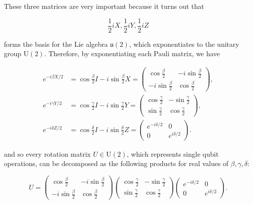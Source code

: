 \documentclass{article}
\begin{document}
  \begin{theorem}
    \label{thm:commutation-relations-of-the-pauli-matrices}
    These three matrices are very important because it turns out that

      \begin{equation}
        \frac{1}{2} i X, \frac{1}{2} i Y, \frac{1}{2} i Z
      \end{equation}

    forms the basis for the Lie algebra $\mathfrak{u}(2)$, which exponentiates to the unitary group $\text{U}(2)$. Therefore, by exponentiating each Pauli matrix, we have

    \begin{align*}
      e^{-i \beta X /2} &= \cos \frac{\beta}{2} I - i \sin \frac{\beta}{2} X = \begin{pmatrix} \cos \frac{\beta}{2} & -i \sin \frac{\beta}{2} \\ -i \sin \frac{\beta}{2} & \cos \frac{\beta}{2} \end{pmatrix}, \\
      e^{-i \gamma Y/2} &= \cos \frac{\gamma}{2} I - i \sin \frac{\gamma}{2} Y = \begin{pmatrix} \cos \frac{\gamma}{2} & - \sin \frac{\gamma}{2} \\ \sin \frac{\gamma}{2} & \cos \frac{\gamma}{2} \end{pmatrix}, \\
      e^{-i \delta Z/2} &= \cos \frac{\delta}{2} I - i \sin \frac{\delta}{2} Z = \begin{pmatrix} e^{-i \delta /2} & 0 \\ 0 & e^{i\delta/2} \end{pmatrix}.
    \end{align*}

    and so every rotation matrix $U \in \text{U}(2)$, which represents single qubit operations, can be decomposed as the following products for real values of $\beta, \gamma, \delta$:

    \begin{equation}
      U = \begin{pmatrix} \cos \frac{\beta}{2} & -i \sin \frac{\beta}{2} \\ -i \sin \frac{\beta}{2} & \cos \frac{\beta}{2} \end{pmatrix} \begin{pmatrix} \cos \frac{\gamma}{2} & - \sin \frac{\gamma}{2} \\ \sin \frac{\gamma}{2} & \cos \frac{\gamma}{2} \end{pmatrix} \begin{pmatrix} e^{-i \delta /2} & 0 \\ 0 & e^{i\delta/2} \end{pmatrix}.
    \end{equation}
  \end{theorem}
\end{document}
